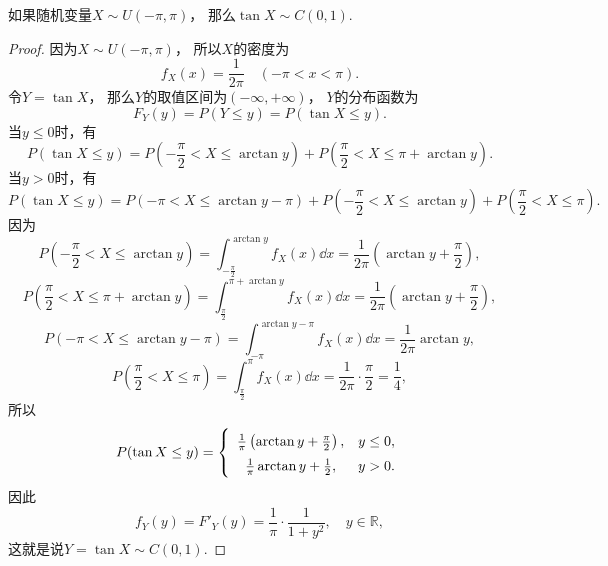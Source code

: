 \begin{proposition}
如果随机变量\(X \sim U(-\pi,\pi)\)，
那么\(\tan X \sim C(0,1)\).
\begin{proof}
因为\(X \sim U(-\pi,\pi)\)，
所以\(X\)的密度为\begin{equation*}
	f_X(x) = \frac{1}{2\pi}
	\quad(-\pi<x<\pi).
\end{equation*}
令\(Y = \tan X\)，
那么\(Y\)的取值区间为\((-\infty,+\infty)\)，
\(Y\)的分布函数为\begin{equation*}
	F_Y(y)
	= P(Y \leq y)
	= P(\tan X \leq y).
\end{equation*}
当\(y\leq0\)时，有\begin{equation*}
	P(\tan X \leq y)
	= P\left(-\frac\pi2 < X \leq \arctan y\right)
	+ P\left(\frac\pi2 < X \leq \pi + \arctan y\right).
\end{equation*}
当\(y>0\)时，有\begin{equation*}
	P(\tan X \leq y)
	= P\left(-\pi < X \leq \arctan y - \pi\right)
	+ P\left(-\frac\pi2 < X \leq \arctan y\right)
	+ P\left(\frac\pi2 < X \leq \pi\right).
\end{equation*}
因为\begin{equation*}
	P\left(-\frac\pi2 < X \leq \arctan y\right)
	= \int_{-\frac\pi2}^{\arctan y} f_X(x) \dd{x}
	= \frac{1}{2\pi} \left(\arctan y + \frac\pi2\right),
\end{equation*}\begin{equation*}
	P\left(\frac\pi2 < X \leq \pi + \arctan y\right)
	= \int_{\frac\pi2}^{\pi + \arctan y} f_X(x) \dd{x}
	= \frac{1}{2\pi} \left(\arctan y + \frac\pi2\right),
\end{equation*}\begin{equation*}
	P\left(-\pi < X \leq \arctan y - \pi\right)
	= \int_{-\pi}^{\arctan y - \pi} f_X(x) \dd{x}
	= \frac{1}{2\pi} \arctan y,
\end{equation*}\begin{equation*}
	P\left(\frac\pi2 < X \leq \pi\right)
	= \int_{\frac\pi2}^\pi f_X(x) \dd{x}
	= \frac{1}{2\pi} \cdot \frac\pi2
	= \frac14,
\end{equation*}
所以\begin{equation*}
	P(\tan X \leq y)
	= \left\{ \def\arraystretch{1.5} \begin{array}{cl}
		\frac1\pi \left(\arctan y + \frac\pi2\right), & y\leq0, \\
		\frac1\pi \arctan y + \frac12, & y>0.
	\end{array} \right.
\end{equation*}
因此\begin{equation*}
	f_Y(y) = F'_Y(y)
	= \frac1\pi \cdot \frac{1}{1+y^2},
	\quad y\in\mathbb{R},
\end{equation*}
这就是说\(Y = \tan X \sim C(0,1)\).
\end{proof}
\end{proposition}


